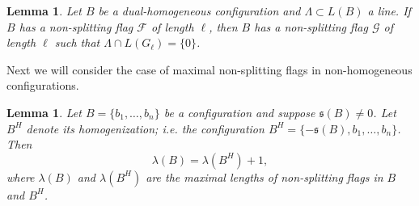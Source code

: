 \documentclass[11pt]{amsart}
\theoremstyle{plain}
\newtheorem{lemma}[theorem]{Lemma}
\theoremstyle{definition}
\theoremstyle{remark}
\newcommand{\fs}{\mathfrak s}
\numberwithin{equation}{section}
\begin{document}
\begin{lemma}\label{lemma22}
Let $B$ be a dual-homogeneous configuration and $\Lambda \subset L(B)$ a line.  If 
 $B$ has a non-splitting flag $\mathcal F$ of length $\ell$, then $B$ has a non-splitting flag $\mathcal G$ of length $\ell$ such that 
 $\Lambda \cap L(G_\ell) =\{0\}$.
\end{lemma}

Next we will consider the case of maximal non-splitting flags in non-homogeneous configurations.  


\begin{lemma}\label{lambda-nothomog}
Let  $B = \{b_1,\dots, b_n\}$
be a configuration and suppose $\fs(B) \not =0$.  Let $B^H$ denote its homogenization; i.e. the configuration
$B^H = \{-\fs(B),b_1,\dots, b_n\}$.
Then
$$\lambda(B) = \lambda(B^H) + 1,$$
where $\lambda(B)$ and $\lambda(B^H)$ are
the maximal lengths of non-splitting flags in $B$ and $B^H$.
\end{lemma}
\end{document}
